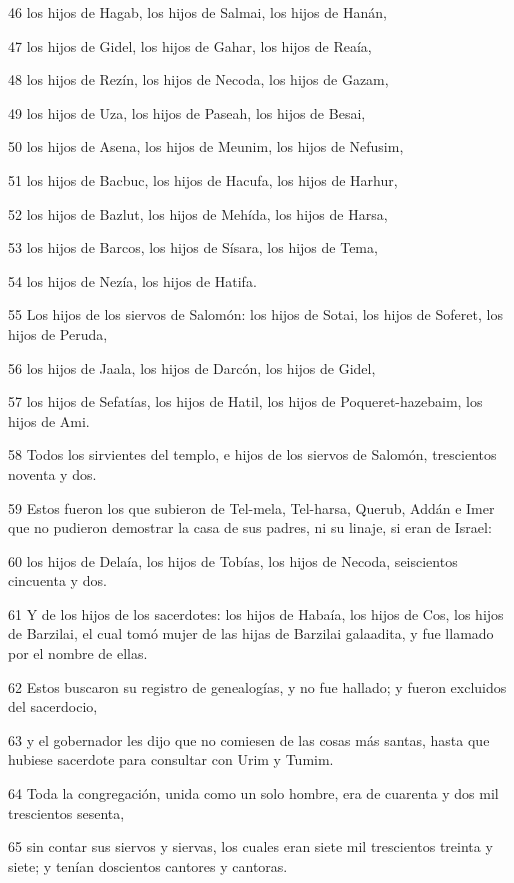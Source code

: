 \par 46 los hijos de Hagab, los hijos de Salmai, los hijos de Hanán,
\par 47 los hijos de Gidel, los hijos de Gahar, los hijos de Reaía,
\par 48 los hijos de Rezín, los hijos de Necoda, los hijos de Gazam,
\par 49 los hijos de Uza, los hijos de Paseah, los hijos de Besai,
\par 50 los hijos de Asena, los hijos de Meunim, los hijos de Nefusim,
\par 51 los hijos de Bacbuc, los hijos de Hacufa, los hijos de Harhur,
\par 52 los hijos de Bazlut, los hijos de Mehída, los hijos de Harsa,
\par 53 los hijos de Barcos, los hijos de Sísara, los hijos de Tema,
\par 54 los hijos de Nezía, los hijos de Hatifa.
\par 55 Los hijos de los siervos de Salomón: los hijos de Sotai, los hijos de Soferet, los hijos de Peruda,
\par 56 los hijos de Jaala, los hijos de Darcón, los hijos de Gidel,
\par 57 los hijos de Sefatías, los hijos de Hatil, los hijos de Poqueret-hazebaim, los hijos de Ami.
\par 58 Todos los sirvientes del templo, e hijos de los siervos de Salomón, trescientos noventa y dos.
\par 59 Estos fueron los que subieron de Tel-mela, Tel-harsa, Querub, Addán e Imer que no pudieron demostrar la casa de sus padres, ni su linaje, si eran de Israel:
\par 60 los hijos de Delaía, los hijos de Tobías, los hijos de Necoda, seiscientos cincuenta y dos.
\par 61 Y de los hijos de los sacerdotes: los hijos de Habaía, los hijos de Cos, los hijos de Barzilai, el cual tomó mujer de las hijas de Barzilai galaadita, y fue llamado por el nombre de ellas.
\par 62 Estos buscaron su registro de genealogías, y no fue hallado; y fueron excluidos del sacerdocio,
\par 63 y el gobernador les dijo que no comiesen de las cosas más santas, hasta que hubiese sacerdote para consultar con Urim y Tumim. 
\par 64 Toda la congregación, unida como un solo hombre, era de cuarenta y dos mil trescientos sesenta,
\par 65 sin contar sus siervos y siervas, los cuales eran siete mil trescientos treinta y siete; y tenían doscientos cantores y cantoras.
